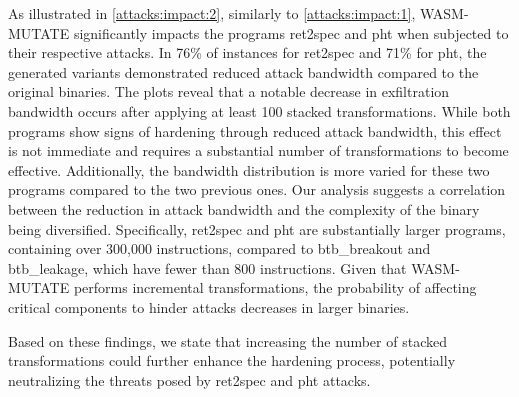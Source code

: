 As illustrated in \autoref{attacks:impact:2}, similarly to \autoref{attacks:impact:1}, WASM-MUTATE significantly impacts the programs ret2spec and pht when subjected to their respective attacks. 
In 76\% of instances for ret2spec and 71\% for pht, the generated variants demonstrated reduced attack bandwidth compared to the original binaries.
The plots reveal that a notable decrease in exfiltration bandwidth occurs after applying at least 100 stacked transformations. 
While both programs show signs of hardening through reduced attack bandwidth, this effect is not immediate and requires a substantial number of transformations to become effective. 
Additionally, the bandwidth distribution is more varied for these two programs compared to the two previous ones.
Our analysis suggests a correlation between the reduction in attack bandwidth and the complexity of the binary being diversified. 
Specifically, ret2spec and pht are substantially larger programs, containing over 300,000 instructions, compared to btb\_breakout and btb\_leakage, which have fewer than 800 instructions. 
Given that WASM-MUTATE performs incremental transformations, the probability of affecting critical components to hinder attacks decreases in larger binaries.

\begin{tcolorbox}[title=Takeaway,boxrule=1pt,arc=.2em,boxsep=1.0mm]
    Based on these findings, we state that increasing the number of stacked transformations could further enhance the hardening process, potentially neutralizing the threats posed by ret2spec and pht attacks.
\end{tcolorbox}

